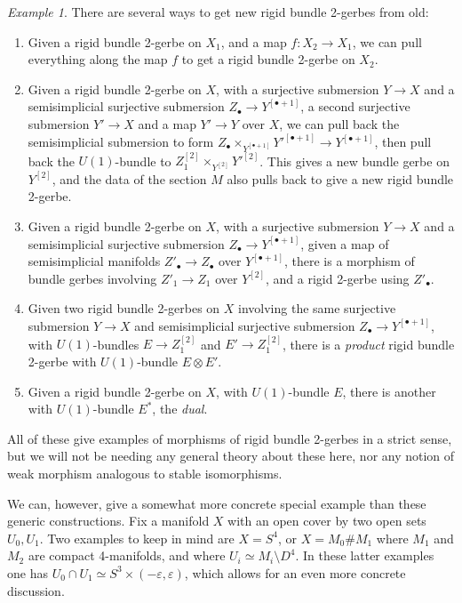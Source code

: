 \documentclass[12pt]{amsart}
\theoremstyle{plain}
\theoremstyle{definition}
\theoremstyle{remark}
\newtheorem{example}[theorem]{Example}
\numberwithin{equation}{section}
\newcommand{\<}{\langle}
\renewcommand{\>}{\rangle}
\begin{document}
\begin{example}\label{example:rb2g_constructions}
There are several ways to get new rigid bundle 2-gerbes from old:
\begin{enumerate}[1.]
\item
  Given a rigid bundle 2-gerbe on $X_1$, and a map $f\colon X_2\to X_1$, we can pull everything along the map $f$ to get a rigid bundle 2-gerbe on $X_2$.
\item
  Given a rigid bundle 2-gerbe on $X$, with a surjective submersion $Y\to X$ and a semisimplicial surjective submersion $Z_\bullet \to Y^{[\bullet+1]}$, a second surjective submersion $Y'\to X$ and a map $Y'\to Y$ over $X$, we can pull back the semisimplicial submersion to form $Z_\bullet\times_{Y^{[\bullet+1]}} Y'^{[\bullet+1]} \to Y^{[\bullet+1]}$, then pull back the $U(1)$-bundle to $Z_1^{[2]}\times_{Y^{[2]}} Y'^{[2]}$. This gives a new bundle gerbe on $Y^{[2]}$, and the data of the section $M$ also pulls back to give a new rigid bundle 2-gerbe.
\item
  Given a rigid bundle 2-gerbe on $X$, with a surjective submersion $Y\to X$ and a semisimplicial surjective submersion $Z_\bullet \to Y^{[\bullet+1]}$, given a map of semisimplicial manifolds $Z'_\bullet \to Z_\bullet$ over $Y^{[\bullet+1]}$, there is a morphism of bundle gerbes involving $Z'_1\to Z_1$ over $Y^{[2]}$, and a rigid 2-gerbe using $Z'_\bullet$.
\item
  Given two rigid bundle 2-gerbes on $X$ involving the same surjective submersion $Y\to X$ and semisimplicial surjective submersion $Z_\bullet \to Y^{[\bullet+1]}$, with $U(1)$-bundles $E\to Z_1^{[2]}$ and $E'\to Z_1^{[2]}$, there is a \emph{product} rigid bundle 2-gerbe with $U(1)$-bundle $E\otimes E'$.
\item
  Given a rigid bundle 2-gerbe on $X$, with $U(1)$-bundle $E$, there is another with $U(1)$-bundle $E^*$, the \emph{dual}.
\end{enumerate}
All of these give examples of morphisms of rigid bundle 2-gerbes in a strict sense, but we will not be needing any general theory about these here, nor any notion of weak morphism analogous to stable isomorphisms.
\end{example}



We can, however, give a somewhat more concrete special example than these generic constructions.
Fix a manifold $X$ with an open cover by two open sets $U_0,U_1$. Two examples to keep in mind are $X=S^4$, or $X = M_0 \# M_1$ where $M_1$ and $M_2$ are compact 4-manifolds, and where $U_i \simeq M_i \setminus D^4$. 
In these latter examples one has $U_0\cap U_1 \simeq S^3 \times (-\varepsilon,\varepsilon)$, which allows for an even more concrete discussion.
\end{document}
